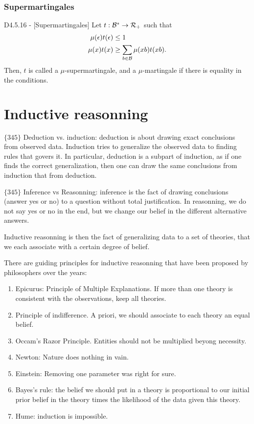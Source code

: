 \documentclass{article}
\begin{document}
\subsubsection{Supermartingales}

\begin{flexidefinition}{D4.5.16 - }[Supermartingales]
    Let $t : \mathcal{B}^\ast \to \mathcal{R}_+$ such that
    \begin{align}
        \mu(\epsilon)t(\epsilon) &\leq 1\\
        \mu(x)t(x) &\geq \sum_{b \in \mathcal{B}} \mu(xb) t(xb).
    \end{align}
    Then, $t$ is called a $\mu$-supermartingale, and a $\mu$-martingale if there is equality in the conditions.
\end{flexidefinition}

\section{Inductive reasonning}

$\{345\}$ Deduction vs. induction: deduction is about drawing exact conclusions from observed data. Induction tries to generalize the observed data to finding rules that govers it. In particular, deduction is a subpart of induction, as if one finds the correct generalization, then one can draw the same conclusions from induction that from deduction.

$\{345\}$ Inference vs Reasonning: inference is the fact of drawing conclusions (answer yes or no) to a question without total justification. In reasonning, we do not say yes or no in the end, but we change our belief in the different alternative answers.

Inductive reasonning is then the fact of generalizing data to a set of theories, that we each associate with a certain degree of belief.

There are guiding principles for inductive reasonning that have been proposed by philosophers over the years:
\begin{enumerate}[label = (\alph*)]
    \item Epicurus: Principle of Multiple Explanations. If more than one theory is consistent with the observations, keep all theories.
    \item Principle of indifference. A priori, we should associate to each theory an equal belief.
    \item Occam's Razor Principle. Entities should not be multiplied beyong necessity.
    \item Newton: Nature does nothing in vain.
    \item Einstein: Removing one parameter was right for sure.
    \item Bayes's rule: the belief we should put in a theory is proportional to our initial prior belief in the theory times the likelihood of the data given this theory.
    \item Hume: induction is impossible.
\end{enumerate}
\end{document}
